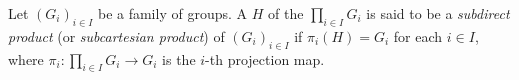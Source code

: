 \documentclass[12pt]{article}
\begin{document}
Let $(G_i)_{i\in I}$ be a family of groups.
A  $H$ of the  $\prod_{i\in I}G_i$
is said to be a \emph{subdirect product} (or \emph{subcartesian product}) of $(G_i)_{i\in I}$
if $\pi_i(H)=G_i$ for each $i\in I$,
where $\pi_i\colon\prod_{i\in I}G_i\to G_i$ is the $i$-th projection map.
\end{document}
